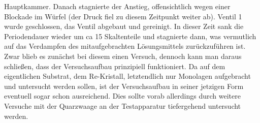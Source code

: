 Hauptkammer. Danach stagnierte der Anstieg, offensichtlich wegen einer Blockade im Würfel (der
Druck fiel zu diesem Zeitpunkt weiter ab). Ventil 1 wurde geschlossen, das Ventil abgebaut und
gereinigt. In dieser Zeit sank die Periodendauer wieder um ca 15 Skaltenteile und stagnierte dann,
was vermutlich auf das Verdampfen des mitaufgebrachten Lösungsmittels zurückzuführen ist.\\
Zwar blieb es zunächst bei diesem einen Versuch, dennoch kann man daraus schließen, dass der
Versuchsaufbau prinzipiell funktioniert. Da auf dem eigentlichen Substrat, dem Re-Kristall,
letztendlich nur Monolagen aufgebracht und untersucht werden sollen, ist der
Versuchsaufbau in seiner jetzigen Form eventuell sogar schon ausreichend. Dies sollte vorab
allerdings durch weitere Versuche mit der Quarzwaage an der Testapparatur tiefergehend untersucht
werden.


























